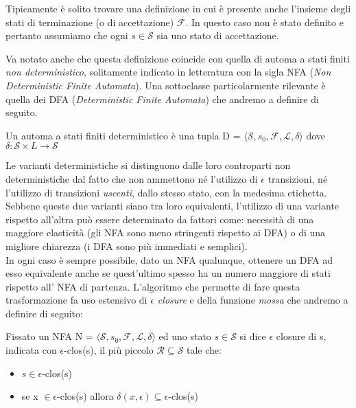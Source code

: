 \begin{remark}
    Tipicamente è solito trovare una definizione in cui è presente anche l'insieme degli stati di terminazione (o di accettazione) $\mathcal{F}$. In questo caso non è stato definito e pertanto assumiamo che ogni $s \in \mathcal{S}$ sia uno stato di accettazione.
\end{remark}

\begin{remark}
    Va notato anche che questa definizione coincide con quella di automa a stati finiti \emph{non deterministico}, solitamente indicato in letteratura con la sigla NFA (\emph{Non Deterministic Finite Automata}). Una sottoclasse particolarmente rilevante è quella dei DFA (\emph{Deterministic Finite Automata}) che andremo a definire di seguito.
\end{remark}

\begin{definition}
    Un automa a stati finiti deterministico è una tupla D = $\langle \mathcal{S}, s_0, \mathcal{F}, \mathcal{L}, \delta \rangle$ dove $\delta : \mathcal{S} \times L \rightarrow \mathcal{S}$
\end{definition}
Le varianti deterministiche si distinguono dalle loro controparti non deterministiche dal fatto che non ammettono né l'utilizzo di $\epsilon$ transizioni, né l'utilizzo di transizioni \emph{uscenti}, dallo stesso stato, con la medesima etichetta. Sebbene queste due varianti siano tra loro equivalenti, l'utilizzo di una variante rispetto all'altra può essere determinato da fattori come: necessità di una maggiore elasticità (gli NFA sono meno stringenti rispetto ai DFA) o di una migliore chiarezza (i DFA sono più immediati e semplici).\\
In ogni caso è sempre possibile, dato un NFA qualunque, ottenere un DFA ad esso equivalente anche se quest'ultimo spesso ha un numero maggiore di stati rispetto all' NFA di partenza. L'algoritmo che permette di fare questa trasformazione fa uso estensivo di \emph{$\epsilon$ closure}\cite{Linguaggi_di_Prorgammazione} e della funzione \emph{mossa}\cite{Linguaggi_di_Prorgammazione} che andremo a definire di seguito:

\begin{definition}
    Fissato un NFA N = $\langle \mathcal{S}, s_0, \mathcal{F}, \mathcal{L}, \delta \rangle$ ed uno stato $s \in \mathcal{S}$ si dice $\epsilon$ closure di s, indicata con $\epsilon$-clos(s), il più piccolo $\mathcal{R} \subseteq \mathcal{S}$ tale che:
    \begin{itemize}
        \item $s \in \epsilon$-clos(s)
        \item se x $\in \epsilon$-clos(s) allora $\delta(x, \epsilon) \subseteq \epsilon$-clos(s)
    \end{itemize}
\end{definition}

